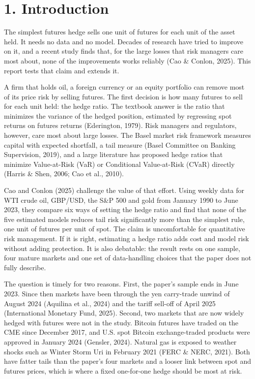 \documentclass[11pt,letterpaper]{article}
\begin{document}
\section*{1. Introduction}

The simplest futures hedge sells one unit of futures for each unit of the asset held. It needs no data and no model. Decades of research have tried to improve on it, and a recent study finds that, for the large losses that risk managers care most about, none of the improvements works reliably (Cao \& Conlon, 2025). This report tests that claim and extends it.

A firm that holds oil, a foreign currency or an equity portfolio can remove most of its price risk by selling futures. The first decision is how many futures to sell for each unit held: the hedge ratio. The textbook answer is the ratio that minimizes the variance of the hedged position, estimated by regressing spot returns on futures returns (Ederington, 1979). Risk managers and regulators, however, care most about large losses. The Basel market risk framework measures capital with expected shortfall, a tail measure (Basel Committee on Banking Supervision, 2019), and a large literature has proposed hedge ratios that minimize Value-at-Risk (VaR) or Conditional Value-at-Risk (CVaR) directly (Harris \& Shen, 2006; Cao et al., 2010).

Cao and Conlon (2025) challenge the value of that effort. Using weekly data for WTI crude oil, GBP/USD, the S\&P 500 and gold from January 1990 to June 2023, they compare six ways of setting the hedge ratio and find that none of the five estimated models reduces tail risk significantly more than the simplest rule, one unit of futures per unit of spot. The claim is uncomfortable for quantitative risk management. If it is right, estimating a hedge ratio adds cost and model risk without adding protection. It is also debatable: the result rests on one sample, four mature markets and one set of data-handling choices that the paper does not fully describe.

The question is timely for two reasons. First, the paper's sample ends in June 2023. Since then markets have been through the yen carry-trade unwind of August 2024 (Aquilina et al., 2024) and the tariff sell-off of April 2025 (International Monetary Fund, 2025). Second, two markets that are now widely hedged with futures were not in the study. Bitcoin futures have traded on the CME since December 2017, and U.S. spot Bitcoin exchange-traded products were approved in January 2024 (Gensler, 2024). Natural gas is exposed to weather shocks such as Winter Storm Uri in February 2021 (FERC \& NERC, 2021). Both have fatter tails than the paper's four markets and a looser link between spot and futures prices, which is where a fixed one-for-one hedge should be most at risk.
\end{document}
